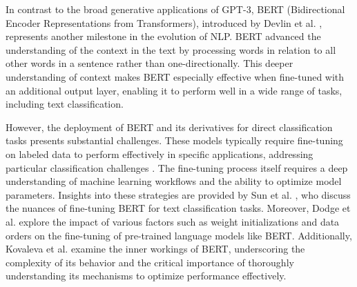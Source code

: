 In contrast to the broad generative applications of GPT-3, BERT (Bidirectional Encoder Representations from Transformers), introduced by Devlin et al. \cite{devlin2018bert}, represents another milestone in the evolution of NLP. BERT advanced the understanding of the context in the text by processing words in relation to all other words in a sentence rather than one-directionally. This deeper understanding of context makes BERT especially effective when fine-tuned with an additional output layer, enabling it to perform well in a wide range of tasks, including text classification.

However, the deployment of BERT and its derivatives for direct classification tasks presents substantial challenges. These models typically require fine-tuning on labeled data to perform effectively in specific applications, addressing particular classification challenges \cite{devlin2018bert}. The fine-tuning process itself requires a deep understanding of machine learning workflows and the ability to optimize model parameters. Insights into these strategies are provided by Sun et al. \cite{sun2019finetune}, who discuss the nuances of fine-tuning BERT for text classification tasks. Moreover, Dodge et al. \cite{dodge2020finetune} explore the impact of various factors such as weight initializations and data orders on the fine-tuning of pre-trained language models like BERT. Additionally, Kovaleva et al. \cite{kovaleva2019secrets} examine the inner workings of BERT, underscoring the complexity of its behavior and the critical importance of thoroughly understanding its mechanisms to optimize performance effectively.
